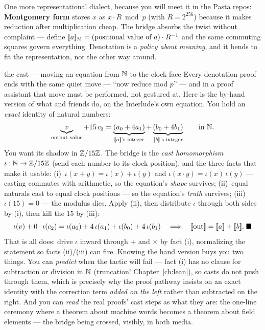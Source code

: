 One more representational dialect, because you will meet it in the Pasta
repos: \textbf{Montgomery form} stores $x$ as $x \cdot R \bmod p$ (with
$R = 2^{256}$) because it makes reduction after multiplication cheap. The
bridge absorbs the twist without complaint --- define
$[\mkern-3.3mu[ a ]\mkern-3.3mu]_{\mathrm{M}} = (\text{positional value of } a) \cdot R^{-1}$
and the same commuting squares govern everything. Denotation is a
\emph{policy about meaning}, and it bends to fit the representation, not
the other way around.

\begin{worked}{the cast --- moving an equation from $\mathbb{N}$ to the clock face}
Every denotation proof ends with the same quiet move --- ``now reduce
mod $p$'' --- and in a proof assistant that move must be performed, not
gestured at. Here is the by-hand version of what  and
friends do, on the Interlude's own equation. You hold an \emph{exact}
identity of natural numbers:
\[
\underbrace{v}_{\text{output value}} + 15\,c_2
= \underbrace{(a_0 + 4a_1)}_{[\mkern-3.3mu[ a ]\mkern-3.3mu]\text{'s integer}} +
  \underbrace{(b_0 + 4b_1)}_{[\mkern-3.3mu[ b ]\mkern-3.3mu]\text{'s integer}}
\qquad\text{in } \mathbb{N} .
\]
You want its shadow in $\mathbb{Z}/15\mathbb{Z}$. The bridge is the \emph{cast
homomorphism} $\iota : \mathbb{N} \to \mathbb{Z}/15\mathbb{Z}$ (send each number to its clock
position), and the three facts that make it usable:
(i)~$\iota(x + y) = \iota(x) + \iota(y)$ and
$\iota(x \cdot y) = \iota(x)\,\iota(y)$ --- casting commutes with
arithmetic, so the equation's \emph{shape} survives;
(ii)~equal naturals cast to equal clock positions --- so the equation's
\emph{truth} survives; (iii)~$\iota(15) = 0$ --- the modulus dies.
Apply (ii), then distribute $\iota$ through both sides by (i), then
kill the $15$ by (iii):
\[
\iota(v) + 0 \cdot \iota(c_2) = \iota(a_0) + 4\,\iota(a_1) +
\iota(b_0) + 4\,\iota(b_1)
\quad\Longrightarrow\quad
[\mkern-3.3mu[ \text{out} ]\mkern-3.3mu] = [\mkern-3.3mu[ a ]\mkern-3.3mu] + [\mkern-3.3mu[ b ]\mkern-3.3mu]. \;\blacksquare
\]
That is all  does: drive $\iota$ inward through $+$ and
$\times$ by fact (i), normalizing the statement so facts (ii)/(iii) can
fire. Knowing the hand version buys you two things. You can
\emph{predict} when the tactic will fail --- fact (i) has no clause for
subtraction or division in $\mathbb{N}$ (truncation! Chapter~\ref{ch:lean}), so
casts do not push through them, which is precisely why the proof
pathway insists on an exact identity with the correction term
\emph{added on the left} rather than subtracted on the right. And you
can \emph{read} the real proofs' cast steps as what they are: the
one-line ceremony where a theorem about machine words becomes a theorem
about field elements --- the bridge being crossed, visibly, in both
media.
\end{worked}

